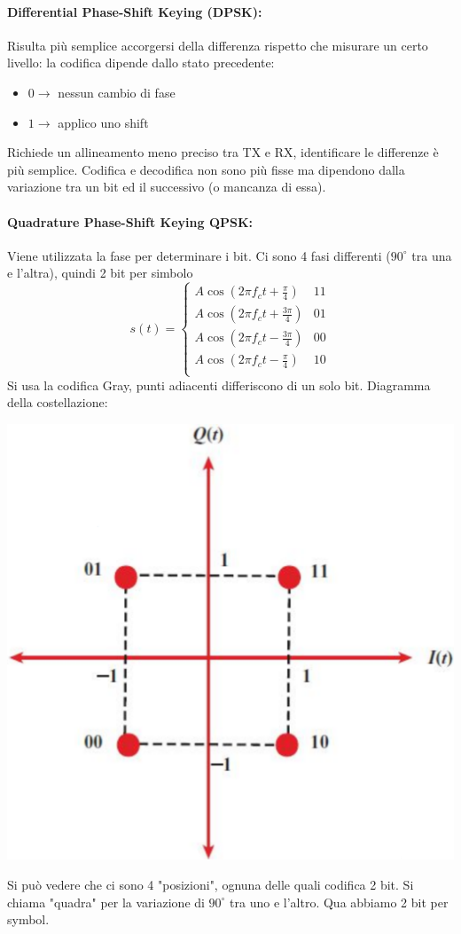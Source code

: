 \newpage

\paragraph{Differential Phase-Shift Keying (DPSK):} Risulta più semplice accorgersi della differenza rispetto che misurare un certo livello: la codifica dipende dallo stato precedente: 
\begin{itemize}
	\item $0 \rightarrow$ nessun cambio di fase
	\item $1 \rightarrow$ applico uno shift
\end{itemize}

Richiede un allineamento meno preciso tra TX e RX, identificare le differenze è più semplice.  Codifica e decodifica non sono più fisse ma dipendono dalla variazione tra un bit ed il successivo (o mancanza di essa).\\


\paragraph{Quadrature Phase-Shift Keying QPSK:} Viene utilizzata la fase per determinare i bit. Ci sono 4 fasi differenti ($90^\circ$ tra una e l'altra), quindi 2 bit per simbolo
$$ s(t) = \begin{cases}
	A \cos \left(2 \pi f_c t + \frac{\pi}{4}\right) & 11 \\
	A \cos \left(2 \pi f_c t + \frac{3 \pi}{4}\right) & 01 \\
	A \cos \left(2 \pi f_c t - \frac{3 \pi}{4}\right) & 00 \\
	A \cos \left(2 \pi f_c t - \frac{\pi}{4}\right) & 10 \\
\end{cases} $$
Si usa la codifica Gray, punti adiacenti differiscono di un solo bit. Diagramma della costellazione:
\begin{center}
	\includegraphics[width=0.45\linewidth]{img/wireless/costellazione1}
\end{center}
Si può vedere che ci sono 4 "posizioni", ognuna delle quali codifica 2 bit. Si chiama "quadra" per la variazione di $90^\circ$ tra uno e l'altro. Qua abbiamo 2 bit per symbol.\\

